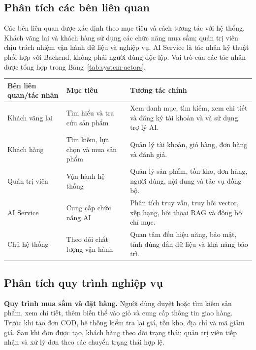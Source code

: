 \subsection{Phân tích các bên liên quan}

Các bên liên quan được xác định theo mục tiêu và cách tương tác với hệ thống.
Khách vãng lai và khách hàng sử dụng các chức năng mua sắm; quản trị viên chịu
trách nhiệm vận hành dữ liệu và nghiệp vụ. AI Service là tác nhân kỹ thuật phối
hợp với Backend, không phải người dùng độc lập. Vai trò của các tác nhân được
tổng hợp trong Bảng~\ref{tab:system-actors}.

\begin{breakabletable}
    \centering
    \caption{Các bên liên quan và tác nhân chính của hệ thống}
    \label{tab:system-actors}
    \begin{tabularx}{\textwidth}{|p{}|p{}|X|}
        \hline
        \textbf{Bên liên quan/tác nhân} & \textbf{Mục tiêu} & \textbf{Tương tác chính} \\ \hline
        Khách vãng lai & Tìm hiểu và tra cứu sản phẩm & Xem danh mục, tìm kiếm, xem chi tiết và đăng ký tài khoản và và sử dụng trợ lý AI. \\ \hline
        Khách hàng & Tìm kiếm, lựa chọn và mua sản phẩm & Quản lý tài khoản, giỏ hàng, đơn hàng và đánh giá. \\ \hline
        Quản trị viên & Vận hành hệ thống & Quản lý sản phẩm, tồn kho, đơn hàng, người dùng, nội dung và tác vụ đồng bộ. \\ \hline
        AI Service & Cung cấp chức năng AI & Phân tích truy vấn, truy hồi vector, xếp hạng, hội thoại RAG và đồng bộ chỉ mục. \\ \hline
        Chủ hệ thống & Theo dõi chất lượng vận hành & Quan tâm đến hiệu năng, bảo mật, tính đúng đắn dữ liệu và khả năng bảo trì. \\ \hline
    \end{tabularx}
\end{breakabletable}

\subsection{Phân tích quy trình nghiệp vụ}

\textbf{Quy trình mua sắm và đặt hàng.}
Người dùng duyệt hoặc tìm kiếm sản phẩm, xem chi tiết, thêm biến thể vào giỏ và
cung cấp thông tin giao hàng. Trước khi tạo đơn COD, hệ thống kiểm tra lại giá,
tồn kho, địa chỉ và mã giảm giá. Sau khi đơn được tạo, khách hàng theo dõi trạng
thái; quản trị viên tiếp nhận và xử lý đơn theo các chuyển trạng thái hợp lệ.

